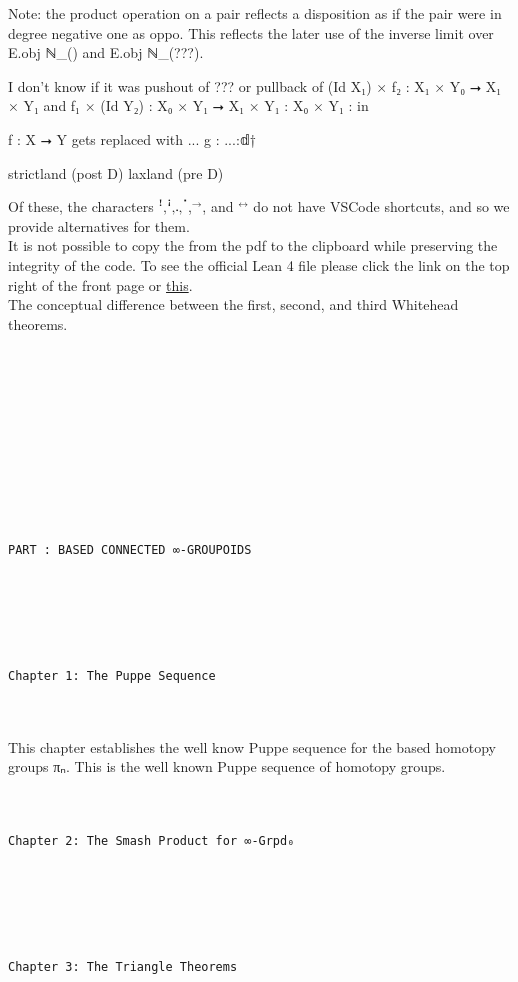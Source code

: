 \documentclass{book}
\theoremstyle{definition}
\newcounter{pcounter}
\renewcommand{\chapter}[1]{
\newpage
{
\Huge 
\begin{center}
\ \\
\ \\
\thispagestyle{empty}
\texttt{#1}
\end{center}}
\ \\
\ \\
}
\newcounter{partcount}
\renewcommand{\part}[1]{
\newpage
{
\Huge 
\begin{center}
\ \\
\ \\
\ \\
\ \\
\ \\
\ \\
\thispagestyle{empty}
\texttt{PART {\thepartcount}: #1}
\stepcounter{partcount}
\end{center}}
\ \\
\ \\
}
\begin{document}
Note: the product operation on a pair reflects a disposition as if the pair were in degree negative one as oppo. This reflects the later use of the inverse limit over E⃗.obj ℕ\_() and E⃗.obj ℕ\_(???).

I don't know if it was pushout of ??? or pullback of (Id X₁) × f₂ : X₁ × Y₀ ⭢ X₁ × Y₁ and f₁ × (Id Y₂) : X₀ × Y₁ ⭢ X₁ × Y₁  : X₀ × Y₁ : in 

f : X ⭢ Y gets replaced with ...
g : ...:𝕕†

strictland (post D)
laxland (pre D)

Of these, the characters $\texttt{ꜝ,ꜞ,𛲔,ॱ}$,${}^{\rightarrow}$, and ${}^{\leftrightarrow}$ do not have VSCode shortcuts, and so we provide alternatives for them.\\

It is not possible to copy the from the pdf to the clipboard while preserving the integrity of the code. To see the official Lean 4 file please click the link on the top right of the front page or \href{https://github.com/linlib/ThreeWhiteheadTheorems}{this}.\\

The conceptual difference between the first, second, and third Whitehead theorems. 

\ \\
\ \\
\ \\
\fi




\part{BASED CONNECTED ∞-GROUPOIDS}


\chapter{Chapter 1: The Puppe Sequence}

This chapter establishes the well know Puppe sequence for the based homotopy groups πₙ. This is the well known Puppe sequence of homotopy groups.


\chapter{Chapter 2: The Smash Product for ∞-Grpd₀}




\chapter{Chapter 3: The Triangle Theorems}
\end{document}
